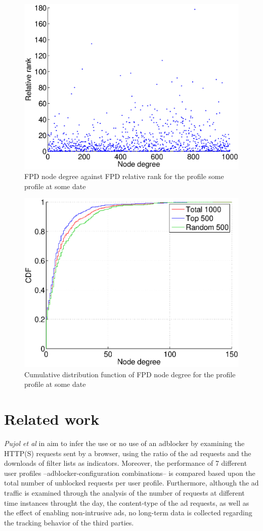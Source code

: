 \documentclass{sig-alternate}
\begin{document}
  \begin{figure}
 \centering
 \includegraphics[width=.45\textwidth]{figures/plots/scatterplot.eps}
 \caption{FPD node degree against FPD relative rank for the profile {\color{red} some profile at some date}}
 \label{fig:first_party_degree_relative_rank}
\end{figure}

\begin{figure}
 \centering
 \includegraphics[width=.45\textwidth]{figures/plots/cdf-first-node-degree.eps}
 \caption{Cumulative distribution function of FPD node degree for the profile {\color{red} profile at some date}}
 \label{fig:cdf_first_node_degree}
\end{figure}


\section{Related work}

\textit{Pujol et al} in \cite{pujol} aim to infer the use or no use of an adblocker by examining the HTTP(S) requests sent by a browser, using the ratio of the ad requests and the downloads of filter lists as indicators. Moreover, the performance of 7 different user profiles --adblocker-configuration combinations-- is compared based upon the total number of unblocked requests per user profile. Furthermore, although the ad traffic is examined through the analysis of the number of requests at different time instances throught the day, the content-type of the ad requests, as well as the effect of enabling non-intrusive ads, no long-term data is collected regarding the tracking behavior of the third parties.
\end{document}
